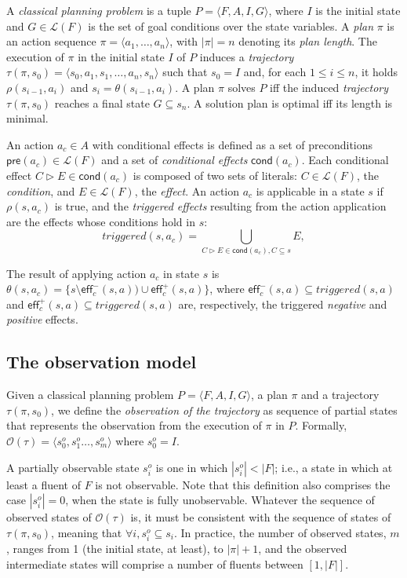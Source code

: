 \documentclass{article}
\newcommand{\tup}[1]{{\langle #1 \rangle}}
\newcommand{\pre}{\mathsf{pre}}     %
\newcommand{\eff}{\mathsf{eff}}     %
\newcommand{\cond}{\mathsf{cond}}   %
\begin{document}
A {\em classical planning problem} is a tuple $P=\tup{F,A,I,G}$, where $I$ is the initial state and $G\in\mathcal{L}(F)$ is the set of goal conditions over the state variables. A {\em plan} $\pi$ is an action sequence $\pi=\tup{a_1, \ldots, a_n}$, with $|\pi|=n$ denoting its {\em plan length}. The execution of $\pi$ in the initial state $I$ of $P$ induces a {\em trajectory} $\tau(\pi,s_0)=\tup{s_0, a_1, s_1, \ldots, a_n, s_n}$ such that $s_0=I$ and, for each {\small $1\leq i\leq n$}, it holds $\rho(s_{i-1},a_i)$ and $s_i=\theta(s_{i-1},a_i)$. A plan $\pi$ solves $P$ iff the induced {\em trajectory} $\tau(\pi,s_0)$ reaches a final state $G \subseteq s_n$. A solution plan is optimal iff its length is minimal.

An action $a_c\in A$ with conditional effects is defined as a set of preconditions $\pre(a_c)\in\mathcal{L}(F)$ and a set of {\em conditional effects} $\cond(a_c)$. Each conditional effect $C\rhd E\in\cond(a_c)$ is composed of two sets of literals: $C\in\mathcal{L}(F)$, the {\em condition}, and $E\in\mathcal{L}(F)$, the {\em effect}. An action $a_c$ is applicable in a state $s$ if $\rho(s,a_c)$ is true, and the {\em triggered effects} resulting from the action application are the effects whose conditions hold in $s$:
\[
triggered(s,a_c)=\bigcup_{C\rhd E\in\cond(a_c),C\subseteq s} E,
\]

The result of applying action $a_c$ in state $s$ is $\theta(s,a_c)=\{s\setminus\eff_c^-(s,a))\cup\eff_c^+(s,a)\}$, where $\eff_c^-(s,a)\subseteq triggered(s,a)$ and $\eff_c^+(s,a)\subseteq triggered(s,a)$ are, respectively, the triggered {\em negative} and {\em positive} effects.


\subsection{The observation model}
Given a classical planning problem $P=\tup{F,A,I,G}$, a plan $\pi$ and a trajectory $\tau(\pi,s_0)$, we define the \emph{observation of the trajectory} as sequence of partial states that represents the observation from the execution of $\pi$ in $P$. Formally, $\mathcal{O}(\tau)=\tup{s_0^o,s_1^o \ldots , s_m^o}$ where $s_0^o=I$.

A partially observable state $s_i^o$ is one in which $|s_i^o| < |F|$; i.e., a state in which at least a fluent of $F$ is not observable. Note that this definition also comprises the case $|s_i^o| = 0$, when the state is fully unobservable. Whatever the sequence of observed states of $\mathcal{O}(\tau)$ is, it must be consistent with the sequence of states of $\tau(\pi,s_0)$, meaning that $\forall i, s_i^o \subseteq s_i$. In practice, the number of observed states, $m$, ranges from 1 (the initial state, at least), to $|\pi|+1$, and the observed intermediate states will comprise a number of fluents between $[1,|F|]$.
\end{document}
